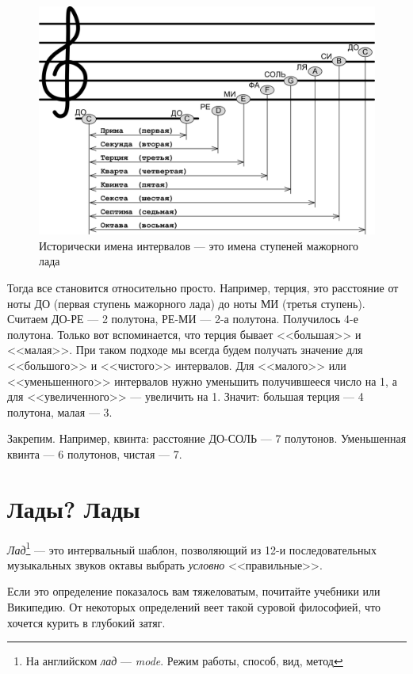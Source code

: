\begin{figure}[!ht]
    \centering
    \includegraphics{fig/intervals/interval-names} 
    \caption{Исторически имена интервалов --- это имена ступеней мажорного лада}\label{fig:harmony:interval:names}
\end{figure} 

Тогда все становится относительно просто. Например, терция, это расстояние от ноты ДО (первая ступень мажорного лада) до ноты МИ (третья ступень). Считаем ДО-РЕ --- 2 полутона, РЕ-МИ --- 2-а полутона. Получилось 4-е полутона. Только вот вспоминается, что терция бывает <<большая>> и <<малая>>. При таком подходе мы всегда будем получать значение для <<большого>> и <<чистого>> интервалов. Для <<малого>> или <<уменьшенного>> интервалов нужно уменьшить получившееся число на 1, а для <<увеличенного>> --- увеличить на 1. Значит: большая терция --- 4 полутона, малая --- 3.

Закрепим. Например, квинта: расстояние ДО-СОЛЬ --- 7 полутонов. Уменьшенная квинта --- 6 полутонов, чистая --- 7.


\section{Лады? Лады}
\label{ch:harmony:lad}

\begin{Definition}[Лад]
    \emph{Лад}\footnote{На английском \emph{лад} --- \emph{mode}. Режим работы, способ, вид, метод} --- это интервальный шаблон, позволяющий из 12-и последовательных музыкальных звуков октавы выбрать \emph{условно} <<правильные>>. 
\end{Definition}

Если это определение показалось вам тяжеловатым, почитайте учебники или Википедию. От некоторых определений веет такой суровой философией, что хочется курить в глубокий затяг. 

